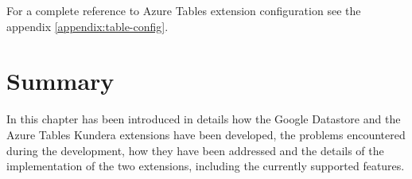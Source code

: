 \noindent For a complete reference to Azure Tables extension configuration see the appendix \ref{appendix:table-config}.

\section{Summary}
In this chapter has been introduced in details how the Google Datastore and the Azure Tables Kundera extensions have been developed, the problems encountered during the development, how they have been addressed and the details of the implementation of the two extensions, including the currently supported features.

